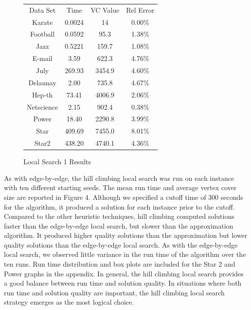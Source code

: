 \documentclass{sig-alternate-05-2015}
\begin{document}
\begin{figure}
\centering
\caption{Local Search 1 Results}
\begin{tabular}{c c c c}
Data Set & Time & VC Value & Rel Error \\
Karate & 0.0024 & 14 & 0.00\% \\
Football & 0.0592 & 95.3 & 1.38\% \\
Jazz & 0.5221 & 159.7 & 1.08\% \\
E-mail & 3.59 & 622.3 & 4.76\% \\
July & 269.93 & 3454.9 & 4.60\% \\
Delaunay & 2.00 & 735.8 & 4.67\% \\
Hep-th & 73.41 & 4006.9 & 2.06\% \\
Netscience & 2.15 & 902.4 & 0.38\% \\
Power & 18.40 & 2290.8 & 3.99\% \\
Star & 409.69 & 7455.0 & 8.01\% \\
Star2 & 438.20 & 4740.1 & 4.36\%
\end{tabular}
\end{figure}




As with edge-by-edge, the hill climbing local search was run on each instance with ten different starting seeds. The mean run time and average vertex cover size are reported in Figure 4. Although we specified a cutoff time of 300 seconds for the algorithm, it produced a solution for each instance prior to the cutoff.  Compared to the other heuristic techniques, hill climbing computed solutions faster than the edge-by-edge local search, but slower than the approximation algorithm. It produced higher quality solutions than the approximation but lower quality solutions than the edge-by-edge local search. As with the edge-by-edge local search, we observed little variance in the run time of the algorithm over the ten runs. Run time distribution and box plots are included for the Star 2 and Power graphs in the appendix. In general, the hill climbing local search provides a good balance between run time and solution quality. In situations where both run time and solution quality are important, the hill climbing local search strategy emerges as the most logical choice.
\end{document}
